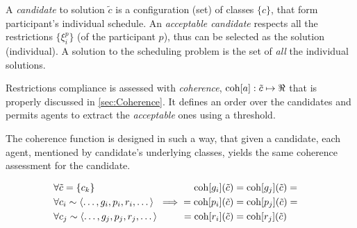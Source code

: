 \medskip

A \emph{candidate} to solution $\tilde{c}$ is a configuration (set) of classes
$\{c\}$, that form participant's individual schedule. An \emph{acceptable candidate}
respects all the restrictions $\{\xi^p_i\}$ (of the participant $p$),
thus can be selected as the solution (individual).
A solution to the scheduling problem is the set of \emph{all} the individual solutions.

\bigskip

\noindent
Restrictions compliance is assessed with \emph{coherence},
$\mathrm{coh}[a]: \tilde c \mapsto \Re$
that is properly discussed in \ref{sec:Coherence}.
It defines an order over the candidates and permits
agents to extract the \emph{acceptable} ones using a threshold.


The coherence function is designed in such a way, that given a candidate,
each agent, mentioned by candidate's underlying classes, yields the same
coherence assessment for the candidate.


\begin{align}
  \label{eq:coh-fun-independ}
  \begin{aligned}
    &\forall \tilde{c} = \{c_k\} \\
    &\forall c_i \sim \left< \dots, g_i, p_i, r_i, \dots \right> \\
    &\forall c_j \sim \left< \dots, g_j, p_j, r_j, \dots \right>
  \end{aligned}
& \implies
  \begin{aligned}
   \mathrm{coh}[g_i](\tilde c) &= \mathrm{coh}[g_j](\tilde c) = \\
   = \mathrm{coh}[p_i](\tilde c) &= \mathrm{coh}[p_j](\tilde c) = \\
   = \mathrm{coh}[r_i](\tilde c) &= \mathrm{coh}[r_j](\tilde c)
  \end{aligned}
\end{align}







%
